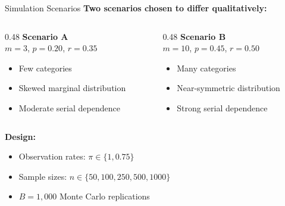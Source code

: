 \documentclass{beamer}
\begin{document}
\begin{frame}{Simulation Scenarios}
\textbf{Two scenarios chosen to differ qualitatively:}

\vspace{0.3cm}

\begin{columns}
\begin{column}{0.48\textwidth}
\textbf{Scenario A}\\
$m=3$, $p=0.20$, $r=0.35$
\begin{itemize}
    \item Few categories
    \item Skewed marginal distribution
    \item Moderate serial dependence
\end{itemize}
\end{column}
\begin{column}{0.48\textwidth}
\textbf{Scenario B}\\
$m=10$, $p=0.45$, $r=0.50$
\begin{itemize}
    \item Many categories
    \item Near-symmetric distribution
    \item Strong serial dependence
\end{itemize}
\end{column}
\end{columns}

\vspace{0.4cm}

\textbf{Design:}
\begin{itemize}
    \item Observation rates: $\pi \in \{1, 0.75\}$
    \item Sample sizes: $n \in \{50, 100, 250, 500, 1000\}$
    \item $B = 1{,}000$ Monte Carlo replications
\end{itemize}
\end{frame}
\end{document}
